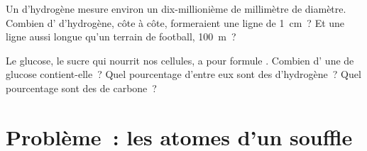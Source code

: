 \begin{exercise}[$\star\star\star$]\label{exo:g7:atoms-and-molecules:11}
Un  d'hydrogène mesure environ un dix-millionième de millimètre de
diamètre. Combien d' d'hydrogène, côte à côte, formeraient une
ligne de \qty{1}{cm}~? Et une ligne aussi longue qu'un terrain de
football, \qty{100}{m}~?
\end{exercise}

\begin{exercise}[$\star\star\star$]\label{exo:g7:atoms-and-molecules:12}
Le glucose, le sucre qui nourrit nos cellules, a pour formule
. Combien d' une  de glucose contient-elle~?
Quel pourcentage d'entre eux sont des  d'hydrogène~? Quel
pourcentage sont des  de carbone~?
\end{exercise}

\section{Problème~: les atomes d'un souffle}

